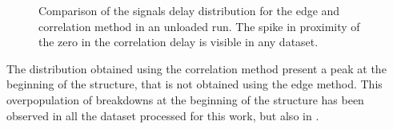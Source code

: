  \begin{figure}[h]
\centering
   \hspace{1mm}
\caption{Comparison of the signals delay distribution for the edge and correlation method in an unloaded run. The spike in proximity of the zero in the correlation delay is visible in any dataset.}
 \label{edge_vs_corr}
 \end{figure}

The distribution obtained using the correlation method present a peak at the beginning of the structure, that is not obtained using the edge method. This overpopulation of breakdowns at the beginning of the structure has been observed in all the dataset processed for this work, but also in \cite{Rajamaki:2143815}.  

